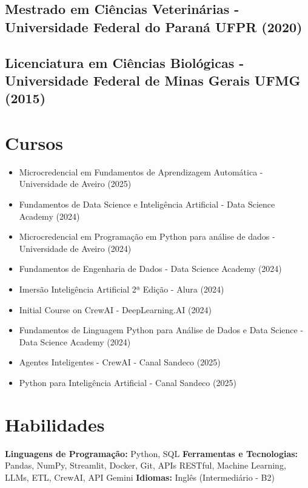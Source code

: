 \documentclass{article}
\begin{document}
\subsection*{Mestrado em Ciências Veterinárias - Universidade Federal do Paraná UFPR (2020)}
\subsection*{Licenciatura em Ciências Biológicas - Universidade Federal de Minas Gerais UFMG (2015)}

\section*{Cursos}
\begin{itemize}
    \item Microcredencial em Fundamentos de Aprendizagem Automática - Universidade de Aveiro (2025)
    \item Fundamentos de Data Science e Inteligência Artificial - Data Science Academy (2024)
    \item Microcredencial em Programação em Python para análise de dados - Universidade de Aveiro (2024)
    \item Fundamentos de Engenharia de Dados - Data Science Academy (2024)
    \item Imersão Inteligência Artificial 2ª Edição - Alura (2024)
    \item Initial Course on CrewAI - DeepLearning.AI (2024)
    \item Fundamentos de Linguagem Python para Análise de Dados e Data Science - Data Science Academy (2024)
    \item Agentes Inteligentes - CrewAI - Canal Sandeco (2025)
    \item Python para Inteligência Artificial - Canal Sandeco (2025)
\end{itemize}

\section*{Habilidades}
\textbf{Linguagens de Programação:} Python, SQL \newline
\textbf{Ferramentas e Tecnologias:} Pandas, NumPy, Streamlit, Docker, Git, APIs RESTful, Machine Learning, LLMs, ETL, CrewAI, API Gemini \newline
\textbf{Idiomas:} Inglês (Intermediário - B2)
\end{document}
